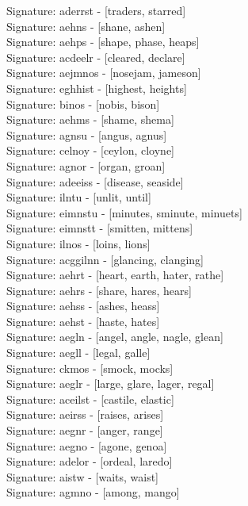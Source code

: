 Signature: {aderrst} - [traders, starred] \\
Signature: {aehns} - [shane, ashen] \\
Signature: {aehps} - [shape, phase, heaps] \\
Signature: {acdeelr} - [cleared, declare] \\
Signature: {aejmnos} - [nosejam, jameson] \\
Signature: {eghhist} - [highest, heights] \\
Signature: {binos} - [nobis, bison] \\
Signature: {aehms} - [shame, shema] \\
Signature: {agnsu} - [angus, agnus] \\
Signature: {celnoy} - [ceylon, cloyne] \\
Signature: {agnor} - [organ, groan] \\
Signature: {adeeiss} - [disease, seaside] \\
Signature: {ilntu} - [unlit, until] \\
Signature: {eimnstu} - [minutes, sminute, minuets] \\
Signature: {eimnstt} - [smitten, mittens] \\
Signature: {ilnos} - [loins, lions] \\
Signature: {acggilnn} - [glancing, clanging] \\
Signature: {aehrt} - [heart, earth, hater, rathe] \\
Signature: {aehrs} - [share, hares, hears] \\
Signature: {aehss} - [ashes, heass] \\
Signature: {aehst} - [haste, hates] \\
Signature: {aegln} - [angel, angle, nagle, glean] \\
Signature: {aegll} - [legal, galle] \\
Signature: {ckmos} - [smock, mocks] \\
Signature: {aeglr} - [large, glare, lager, regal] \\
Signature: {aceilst} - [castile, elastic] \\
Signature: {aeirss} - [raises, arises] \\
Signature: {aegnr} - [anger, range] \\
Signature: {aegno} - [agone, genoa] \\
Signature: {adelor} - [ordeal, laredo] \\
Signature: {aistw} - [waits, waist] \\
Signature: {agmno} - [among, mango] \\
